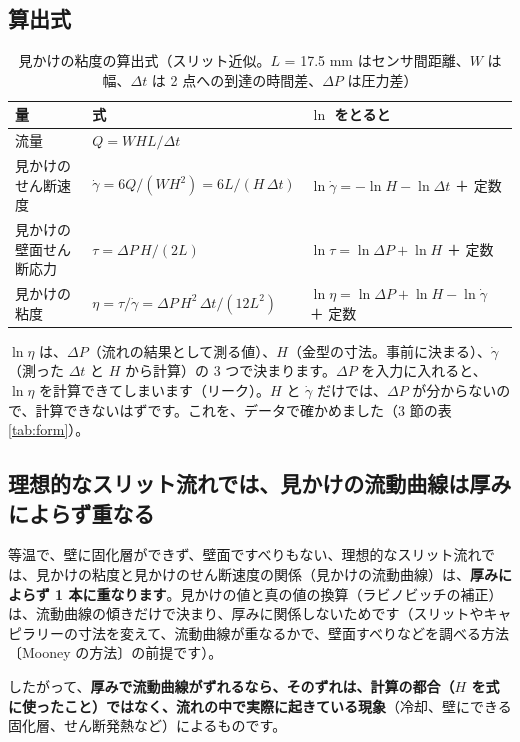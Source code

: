 \documentclass[paper=a4paper,fontsize=10.5pt,line_length=44zw,number_of_lines=38]{jlreq}
\newcommand{\gd}{\dot{\gamma}}
\begin{document}
\subsection{算出式}
\begin{table}[H]
\caption{見かけの粘度の算出式（スリット近似。$L$ = 17.5 mm はセンサ間距離、$W$ は幅、$\Delta t$ は 2 点への到達の時間差、$\Delta P$ は圧力差）}\label{tab:eq}
\begin{tabularx}{\linewidth}{@{}l>{\raggedright\arraybackslash}p{13\zw}X@{}}
\toprule
量 & 式 & $\ln$ をとると \\
\midrule
流量 & $Q = W H L/\Delta t$ & \\
見かけのせん断速度 & $\gd = 6Q/(W H^2) = 6L/(H\,\Delta t)$ & $\ln\gd = -\ln H - \ln\Delta t$ ＋ 定数 \\
見かけの壁面せん断応力 & $\tau = \Delta P\,H/(2L)$ & $\ln\tau = \ln\Delta P + \ln H$ ＋ 定数 \\
見かけの粘度 & $\eta = \tau/\gd = \Delta P\,H^2\,\Delta t/(12L^2)$ & $\ln\eta = \ln\Delta P + \ln H - \ln\gd$ ＋ 定数 \\
\bottomrule
\end{tabularx}
\end{table}
$\ln\eta$ は、$\Delta P$（流れの結果として測る値）、$H$（金型の寸法。事前に決まる）、$\gd$（測った $\Delta t$ と $H$ から計算）の 3 つで決まります。$\Delta P$ を入力に入れると、$\ln\eta$ を計算できてしまいます（リーク）。$H$ と $\gd$ だけでは、$\Delta P$ が分からないので、計算できないはずです。これを、データで確かめました（3 節の表\ref{tab:form}）。

\subsection{理想的なスリット流れでは、見かけの流動曲線は厚みによらず重なる}
等温で、壁に固化層ができず、壁面ですべりもない、理想的なスリット流れでは、見かけの粘度と見かけのせん断速度の関係（見かけの流動曲線）は、\textbf{厚みによらず 1 本に重なります}。見かけの値と真の値の換算（ラビノビッチの補正）は、流動曲線の傾きだけで決まり、厚みに関係しないためです（スリットやキャピラリーの寸法を変えて、流動曲線が重なるかで、壁面すべりなどを調べる方法〔Mooney の方法〕の前提です）。

したがって、\textbf{厚みで流動曲線がずれるなら、そのずれは、計算の都合（$H$ を式に使ったこと）ではなく、流れの中で実際に起きている現象}（冷却、壁にできる固化層、せん断発熱など）によるものです。
\end{document}
